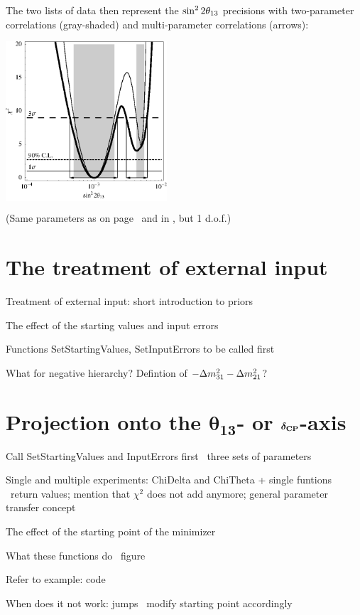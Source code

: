 {The two lists of data then represent the $\sin^2 2 \theta_{13}$ precisions with two-parameter correlations (gray-shaded) and multi-parameter correlations (arrows):
\begin{center}
\colorbox{white}{\includegraphics[width=6cm]{projallex}}

\vspace*{0.1cm}

\footnotesize{(Same parameters as on page~\pageref{ex:corrth13dcp} and in , but 1 d.o.f.)}
\end{center}
}

\section{The treatment of external input}

\bi
\item
 Treatment of external input: short introduction to priors
\item
 The effect of the starting values and input errors
\item
 Functions SetStartingValues, SetInputErrors to be called first
\item
 What for negative hierarchy? Defintion of $-\Delta m_{31}^2 - \Delta m_{21}^2$?
\ei

\section[Projection onto the $\theta_{13}$-axis or $\deltacp$-axis]{Projection onto the $\boldsymbol{\theta_{13}}$- or $\boldsymbol{\delta_{\mathrm{CP}}}$-axis}

\bi
\item
 Call SetStartingValues and InputErrors first \ra\ three sets of parameters 
\item
 Single and multiple experiments: ChiDelta and ChiTheta + single funtions \ra\ return values;
mention that $\chi^2$ does not add anymore; general parameter transfer concept
\item
 The effect of the starting point of the minimizer
\item
 What these functions do \ra\ figure
\item
 Refer to example: code
\item
 When does it not work: jumps \ra\ modify starting point accordingly
\ei

